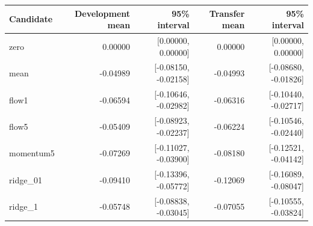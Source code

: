 \begin{tabular}{lrrrr}
\toprule
Candidate & Development mean & 95\% interval & Transfer mean & 95\% interval \\
\midrule
zero & 0.00000 & [0.00000, 0.00000] & 0.00000 & [0.00000, 0.00000] \\
mean & -0.04989 & [-0.08150, -0.02158] & -0.04993 & [-0.08680, -0.01826] \\
flow1 & -0.06594 & [-0.10646, -0.02982] & -0.06316 & [-0.10440, -0.02717] \\
flow5 & -0.05409 & [-0.08923, -0.02237] & -0.06224 & [-0.10546, -0.02440] \\
momentum5 & -0.07269 & [-0.11027, -0.03900] & -0.08180 & [-0.12521, -0.04142] \\
ridge\_01 & -0.09410 & [-0.13396, -0.05772] & -0.12069 & [-0.16089, -0.08047] \\
ridge\_1 & -0.05748 & [-0.08838, -0.03045] & -0.07055 & [-0.10555, -0.03824] \\
\bottomrule
\end{tabular}
